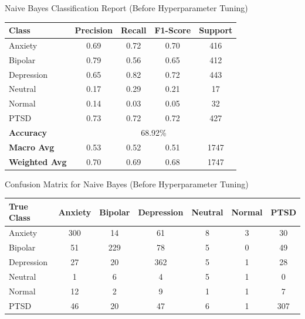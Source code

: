 \begin{center}
    Naive Bayes Classification Report (Before Hyperparameter Tuning)
\begin{tabular}{|l|c|c|c|c|}
\hline
\textbf{Class} & \textbf{Precision} & \textbf{Recall} & \textbf{F1-Score} & \textbf{Support} \\ \hline
Anxiety        & 0.69               & 0.72            & 0.70              & 416              \\ \hline
Bipolar        & 0.79               & 0.56            & 0.65              & 412              \\ \hline
Depression     & 0.65               & 0.82            & 0.72              & 443              \\ \hline
Neutral        & 0.17               & 0.29            & 0.21              & 17               \\ \hline
Normal         & 0.14               & 0.03            & 0.05              & 32               \\ \hline
PTSD           & 0.73               & 0.72            & 0.72              & 427              \\ \hline
\textbf{Accuracy} & \multicolumn{4}{|c|}{68.92\%} \\ \hline
\textbf{Macro Avg} & 0.53            & 0.52            & 0.51              & 1747             \\ \hline
\textbf{Weighted Avg} & 0.70         & 0.69            & 0.68              & 1747             \\ \hline
\end{tabular}

\vspace{0.25in}

Confusion Matrix for Naive Bayes (Before Hyperparameter Tuning)
\begin{tabular}{|l|c|c|c|c|c|c|}
\hline
\textbf{True Class} & \textbf{Anxiety} & \textbf{Bipolar} & \textbf{Depression} & \textbf{Neutral} & \textbf{Normal} & \textbf{PTSD} \\ \hline
Anxiety             & 300              & 14               & 61                  & 8                & 3               & 30            \\ \hline
Bipolar             & 51               & 229              & 78                  & 5                & 0               & 49            \\ \hline
Depression          & 27               & 20               & 362                 & 5                & 1               & 28            \\ \hline
Neutral             & 1                & 6                & 4                   & 5                & 1               & 0             \\ \hline
Normal              & 12               & 2                & 9                   & 1                & 1               & 7             \\ \hline
PTSD                & 46               & 20               & 47                  & 6                & 1               & 307           \\ \hline
\end{tabular}


\end{center}
